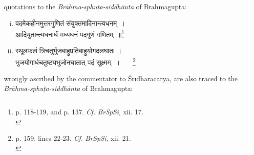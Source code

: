 \documentclass[10pt, openany]{book}
\begin{document}
\newpage

\englishfont{}
{quotations to the \textit{Brāhma-sphuṭa-siddhānta} of Brahmagupta:}

\begin{enumerate}[(i)]
    \item {\qt पदमेकहीनमुत्तरगुणितं संयुक्तमादिनान्त्यधनम्~। \\
 आदियुतान्त्यधनार्धं मध्यधनं पदगुणं गणितम्~॥}\renewcommand{\thefootnote}{1}\footnote{\hspace{-2mm} \englishfont p. 118-119, and p. 137. \textit{Cf. BrSpSi,} xii. 17.\\}

 \item {\qt स्थूलफलं त्रिचतुर्भुजबाहुप्रतिबाहुयोगदलघातः~। \\
 भुजयोगार्धचतुष्टयभुजोनघातात् पदं सूक्ष्मम्~॥}~~~~\renewcommand{\thefootnote}{\hspace{-4.5mm} 2}\footnote{\hspace{-2mm} \englishfont p. 159, lines 22-23. \textit{Cf. BrSpSi,} xii. 21.\\}
 \end{enumerate}

{wrongly ascribed by the commentator to Śrīdharācārya, are}
{also traced to the \textit{Brāhma-sphuṭa-siddhānta} of Brahmagupta:}
\end{document}
